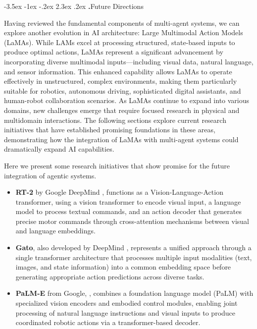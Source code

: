 \documentclass[journal,twoside,10pt]{IEEEtran}
\makeatletter
\renewcommand\section{\@startsection{section}{1}{\z@}%
                       {-3.5ex \@plus -1ex \@minus -.2ex}%
                       {2.3ex \@plus.2ex}%
                       {\normalfont\Large\bfseries\Roman{section}.\quad}}
\makeatother
\begin{document}
\section{Future Directions} 

Having reviewed the fundamental components of multi-agent systems, we can explore another evolution in AI architecture: Large Multimodal Action Models (LaMAs). While LAMs excel at processing structured, state-based inputs to produce optimal actions, LaMAs represent a significant advancement by incorporating diverse multimodal inputs—including visual data, natural language, and sensor information. This enhanced capability allows LaMAs to operate effectively in unstructured, complex environments, making them particularly suitable for robotics, autonomous driving, sophisticated digital assistants, and human-robot collaboration scenarios. As LaMAs continue to expand into various domains, new challenges emerge that require focused research in physical and multidomain interactions. The following sections explore current research initiatives that have established promising foundations in these areas, demonstrating how the integration of LaMAs with multi-agent systems could dramatically expand AI capabilities.

Here we present some research initiatives that show promise for the future integration of agentic systems.

\begin{itemize}
    \item \textbf{RT-2} by Google DeepMind \cite{brohan2023rt2}, functions as a Vision-Language-Action transformer, using a vision transformer to encode visual input, a language model to process textual commands, and an action decoder that generates precise motor commands through cross-attention mechanisms between visual and language embeddings.
    
    \item \textbf{Gato}, also developed by DeepMind \cite{reed2022generalist}, represents a unified approach through a single transformer architecture that processes multiple input modalities (text, images, and state information) into a common embedding space before generating appropriate action predictions across diverse tasks.
    
    \item \textbf{PaLM-E} from Google, \cite{driess2023palme}, combines a foundation language model (PaLM) with specialized vision encoders and embodied control modules, enabling joint processing of natural language instructions and visual inputs to produce coordinated robotic actions via a transformer-based decoder.
\end{itemize}
\end{document}
